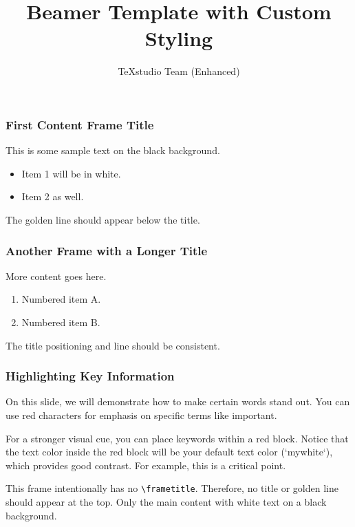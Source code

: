 \documentclass[12pt]{beamer} %
\title{Beamer Template with Custom Styling}
\author{TeXstudio Team (Enhanced)}
\date{} %
\begin{document}
	
	\begin{frame}[plain]
		\maketitle 
	\end{frame}
	
	\begin{frame}
		\frametitle{First Content Frame Title}
		This is some sample text on the black background.
		\begin{itemize}
			\item Item 1 will be in white.
			\item Item 2 as well.
		\end{itemize}
		The golden line should appear below the title.
	\end{frame}
	
	\begin{frame}
		\frametitle{Another Frame with a Longer Title}
		More content goes here.
		\begin{enumerate}
			\item Numbered item A.
			\item Numbered item B.
		\end{enumerate}
		The title positioning and line should be consistent.
	\end{frame}
	
	\begin{frame}
		\frametitle{Highlighting Key Information} %
		
		On this slide, we will demonstrate how to make certain words stand out.
		You can use red characters for emphasis on specific terms like important.
		
		For a stronger visual cue, you can place keywords within a \colorbox{myred}{red block}.
		Notice that the text color inside the red block will be your default text color (`mywhite`), which provides good contrast. For example, this is a \colorbox{myred}{critical point}.
	\end{frame}
	
	
	\begin{frame}
		This frame intentionally has no \texttt{\textbackslash frametitle}.
		Therefore, no title or golden line should appear at the top.
		Only the main content with white text on a black background\cite{shamir2010learning}.
	\end{frame}
	
\end{document}
